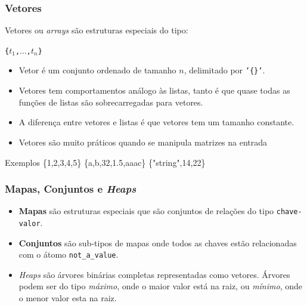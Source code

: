 \begin{frame}[fragile]
	\frametitle{Vetores} 
	
	Vetores ou \textit{arrays} são estruturas especiais do tipo:
	\begin{center}
		 \texttt{\{$t_1$,$\ldots$,$t_{n}$\}}
		\end{center}
	
	\begin{itemize}
	 \pause
	   \item Vetor é um conjunto ordenado de tamanho $n$, delimitado por \texttt{'\{\}'}.
	   \item 	Vetores tem comportamentos análogo às listas, tanto é que quase todas as funções de listas
	são sobrecarregadas para vetores. 
	
		   \item A diferença entre vetores e listas é que vetores tem um tamanho  constante.
		   \item Vetores são muito práticos quando se manipula matrizes na entrada
		   
	 \end{itemize} 

	
	\begin{block}{Exemplos}
		\{1,2,3,4,5\} \: \{a,b,32,1.5,aaac\} \: \{"string",14,22\}
	\end{block}
	
\end{frame}


\begin{frame}
	\frametitle{Mapas, Conjuntos e \textit{Heaps}}
	
	\begin{itemize}
		\item \textbf{Mapas} são estruturas especiais que são conjuntos de relações do tipo \texttt{chave-valor}.
		
		\item \textbf{Conjuntos} são sub-tipos de mapas onde todos as chaves estão relacionadas com o átomo 
		\texttt{not\_a\_value}.
		
		\item \textit{Heaps} são árvores binárias completas representadas como vetores.
		Árvores podem ser do tipo \textit{máximo}, onde o maior valor está na raiz, ou \textit{mínimo}, 
		onde o menor valor esta na raiz.
	\end{itemize}
	
\end{frame}

